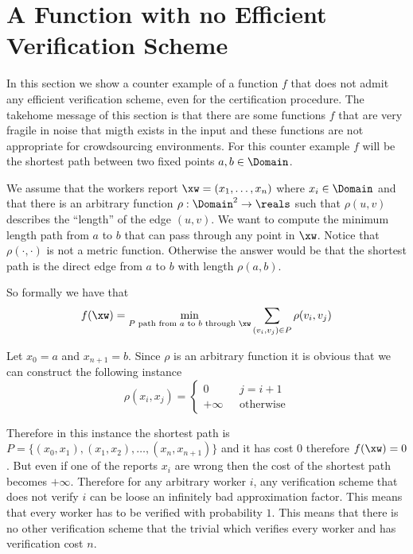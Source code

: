 \section{A Function with no Efficient Verification Scheme}
\label{sec:impos}

  In this section we show a counter example of a function $f$ that does not admit any efficient verification scheme, even for the certification procedure. The
takehome message of this section is that there are some functions $f$ that are very fragile in noise that migth exists in the input and these functions are not
appropriate for crowdsourcing environments. For this counter example $f$ will be the shortest path between two fixed points $a, b \in \Domain$.

  We assume that the workers report $\xw = (x_1, \dots, x_n)$ where $x_i \in \Domain$ and that there is an arbitrary function $\rho : \Domain^2 \to \reals$ such that
$\rho(u, v)$ describes the ``length'' of the edge $(u, v)$. We want to compute the minimum length path from $a$ to $b$ that can pass through any point in $\xw$. Notice
that $\rho(\cdot, \cdot)$ is not a metric function. Otherwise the answer would be that the shortest path is the direct edge from $a$ to $b$ with length $\rho(a, b)$.

  So formally we have that
  \[ f(\xw) = \min_{\text{$P$ path from $a$ to $b$ through $\xw$}} \sum_{(v_i, v_j) \in P} \rho(v_i, v_j) \]

  \noindent Let $x_0 = a$ and $x_{n + 1} = b$. Since $\rho$ is an arbitrary function it is obvious that we can construct the following instance
  \begin{equation*}
    \rho(x_i, x_j) = \left\{
    \begin{split}
      0 ~~~~~~&  j = i + 1 \\
      +\infty~~~ & \text{otherwise}
    \end{split}
    \right.
  \end{equation*}

  Therefore in this instance the shortest path is $P = \{(x_0, x_1), (x_1, x_2), \dots, (x_n, x_{n + 1})\}$ and it has cost $0$ therefore $f(\xw) = 0$. But even if one
of the reports $x_i$ are wrong then the cost of the shortest path becomes $+\infty$. Therefore for any arbitrary worker $i$, any verification scheme that does not
verify $i$ can be loose an infinitely bad approximation factor. This means that every worker has to be verified with probability $1$. This means that there is no
other verification scheme that the trivial which verifies every worker and has verification cost $n$.
